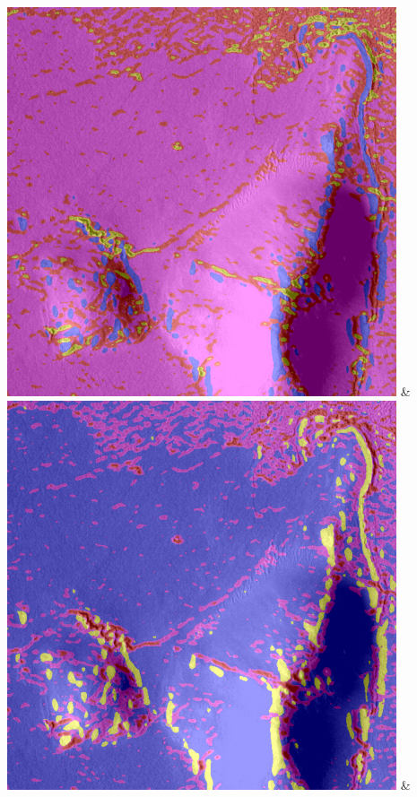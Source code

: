 \begin{table}[h!]
\begin{tabularx}{\textwidth}
		\includegraphics[width=0.9\linewidth]{images/gen/color_weight/p03_04.png_0.66.png} &
		\includegraphics[width=0.9\linewidth]{images/gen/color_weight/p03_04.png_1.00.png} &

\end{tabularx}
\end{table}
